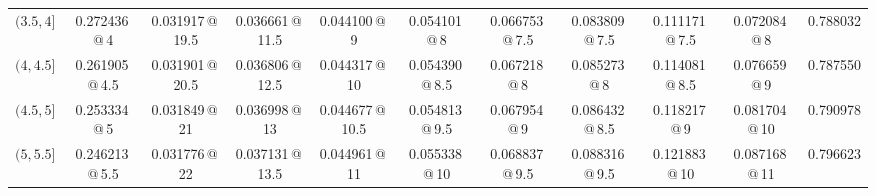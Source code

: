 \documentclass[11pt]{amsart}
\theoremstyle{definition}
\begin{document}
\begin{landscape}
\begin{center}
\begin{tabular}{c|c|cccccccc|c}
$(3.5,4]$ & 0.272436\,@\,4 & 0.031917\,@\,19.5 & 0.036661\,@\,11.5 & 0.044100\,@\,9 & 0.054101\,@\,8 & 0.066753\,@\,7.5 & 0.083809\,@\,7.5 & 0.111171\,@\,7.5 & 0.072084\,@\,8 & 0.788032 \\
$(4,4.5]$ & 0.261905\,@\,4.5 & 0.031901\,@\,20.5 & 0.036806\,@\,12.5 & 0.044317\,@\,10 & 0.054390\,@\,8.5 & 0.067218\,@\,8 & 0.085273\,@\,8 & 0.114081\,@\,8.5 & 0.076659\,@\,9 & 0.787550 \\
$(4.5,5]$ & 0.253334\,@\,5 & 0.031849\,@\,21 & 0.036998\,@\,13 & 0.044677\,@\,10.5 & 0.054813\,@\,9.5 & 0.067954\,@\,9 & 0.086432\,@\,8.5 & 0.118217\,@\,9 & 0.081704\,@\,10 & 0.790978 \\
$(5,5.5]$ & 0.246213\,@\,5.5 & 0.031776\,@\,22 & 0.037131\,@\,13.5 & 0.044961\,@\,11 & 0.055338\,@\,10 & 0.068837\,@\,9.5 & 0.088316\,@\,9.5 & 0.121883\,@\,10 & 0.087168\,@\,11 & 0.796623 \\
\bottomrule
\end{tabular}
\end{center}
\end{landscape}
\end{document}
